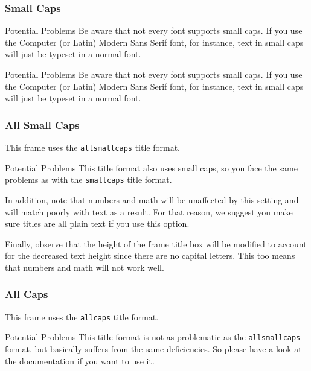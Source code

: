 \documentclass[10pt]{beamer}
\begin{document}
{
  \begin{frame}
    \frametitle{Small Caps}

    \begin{alertblock}{Potential Problems}
      Be aware that not every font supports small caps. If you use
      the Computer (or Latin) Modern Sans Serif font, for instance,
      text in small caps will just be typeset in a normal font.
    \end{alertblock}

    \begin{exampleblock}{Potential Problems}
      Be aware that not every font supports small caps. If you use
      the Computer (or Latin) Modern Sans Serif font, for instance,
      text in small caps will just be typeset in a normal font.
    \end{exampleblock}
  \end{frame}
}

{
  \begin{frame}
    \frametitle{All Small Caps}
    This frame uses the \texttt{allsmallcaps} title format.

    \begin{alertblock}{Potential Problems}
      This title format also uses small caps, so you face the same
      problems as with the \texttt{smallcaps} title format.

      \medskip

      In addition, note that numbers and math will be unaffected by
      this setting and will match
      poorly with text as a result. For that reason, we suggest you
      make sure titles are all
      plain text if you use this option.

      \medskip

      Finally, observe that the height of the frame title box will be
      modified to account for the
      decreased text height since there are no capital letters. This
      too means that numbers and
      math will not work well.
    \end{alertblock}
  \end{frame}
}

{
  \begin{frame}
    \frametitle{All Caps}
    This frame uses the \texttt{allcaps} title format.

    \begin{alertblock}{Potential Problems}
      This title format is not as problematic as the
      \texttt{allsmallcaps} format, but basically suffers from the
      same deficiencies. So please have a look at the documentation
      if you want to use it.
    \end{alertblock}
  \end{frame}
}
\end{document}
